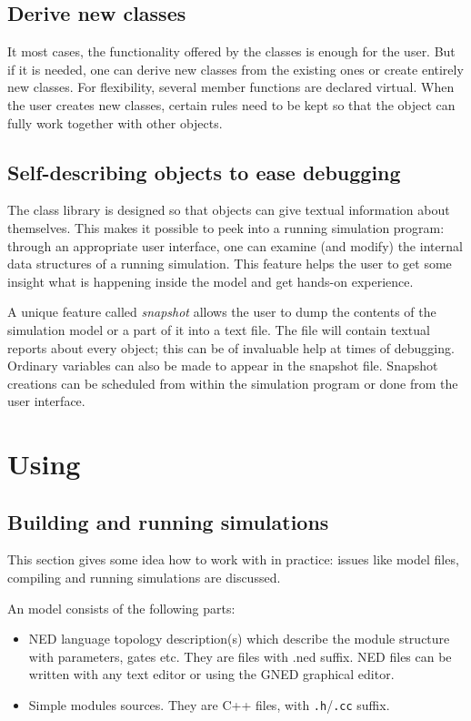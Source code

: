 \subsection{Derive new classes}

It most cases, the functionality offered by the {\opp} classes
is enough for the user. But if it is needed, one can derive new
classes from the existing ones or create entirely new classes.
For flexibility, several member functions are declared virtual.
When the user creates new classes, certain rules need to be kept
so that the object can fully work together with other objects.


\subsection{Self-describing objects to ease debugging}

The class library is designed so that objects can give textual
information about themselves. This makes it possible to peek
into a running simulation program: through an appropriate user
interface, one can examine (and modify) the internal data structures
of a running simulation. This feature helps the user to get some
insight what is happening inside the model and get hands-on experience.


A unique feature called \textit{snapshot} allows the
user to dump the contents of the simulation model or a part of it into
a text file. The file will contain textual reports about every object;
this can be of invaluable help at times of debugging. Ordinary
variables can also be made to appear in the snapshot file. Snapshot
creations can be scheduled from within the simulation program or done
from the user interface.



\section{Using {\opp}}


\subsection{Building and running simulations}

This section gives some idea how to work with {\opp} in practice:
issues like model files, compiling and running simulations are
discussed.

An {\opp} model consists of the following parts:
\begin{itemize}
  \item{NED language topology description(s) which
    describe the module structure with parameters, gates etc. They are
    files with .ned suffix. NED files can be written with any text
    editor or using the GNED graphical editor.}
  \item{ Simple modules sources. They are C++ files, with \texttt{.h}/\texttt{.cc} suffix.}
\end{itemize}

